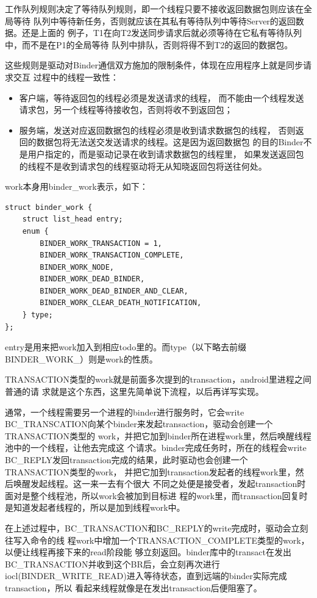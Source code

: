 \documentclass[a4paper,11pt]{article}
\begin{document}
工作队列规则决定了等待队列规则，即一个线程只要不接收返回数据包则应该在全局等待
队列中等待新任务，否则就应该在其私有等待队列中等待Server的返回数据。还是上面的
例子，T1在向T2发送同步请求后就必须等待在它私有等待队列中，而不是在P1的全局等待
队列中排队，否则将得不到T2的返回的数据包。

这些规则是驱动对Binder通信双方施加的限制条件，体现在应用程序上就是同步请求交互
过程中的线程一致性：
\begin{itemize}
    \item 客户端，等待返回包的线程必须是发送请求的线程，
        而不能由一个线程发送请求包，另一个线程等待接收包，否则将收不到返回包；
    \item 服务端，发送对应返回数据包的线程必须是收到请求数据包的线程，
        否则返回的数据包将无法送交发送请求的线程。这是因为返回数据包
        的目的Binder不是用户指定的，而是驱动记录在收到请求数据包的线程里，
        如果发送返回包的线程不是收到请求包的线程驱动将无从知晓返回包将送往何处。
\end{itemize}

work本身用binder_work表示，如下：
\begin{lstlisting}
struct binder_work {
    struct list_head entry;
    enum {
        BINDER_WORK_TRANSACTION = 1,
        BINDER_WORK_TRANSACTION_COMPLETE,
        BINDER_WORK_NODE,
        BINDER_WORK_DEAD_BINDER,
        BINDER_WORK_DEAD_BINDER_AND_CLEAR,
        BINDER_WORK_CLEAR_DEATH_NOTIFICATION,
    } type;
};
\end{lstlisting}
entry是用来把work加入到相应todo里的。而type（以下略去前缀BINDER_WORK_）则是work的性质。

TRANSACTION类型的work就是前面多次提到的transaction，android里进程之间普通的请
求就是这个东西，这里先简单说下流程，以后再详写实现。

通常，一个线程需要另一个进程的binder进行服务时，它会write
BC_TRANSCATION向某个binder来发起transaction，驱动会创建一个TRANSACTION类型的
work，并把它加到binder所在进程work里，然后唤醒线程池中的一个线程，让他去完成这
个请求。binder完成任务时，所在的线程会write
BC_REPLY发回transaction完成的结果，此时驱动也会创建一个TRANSACTION类型的work，
并把它加到transaction发起者的线程work里，然后唤醒发起线程。这一来一去有个很大
不同之处便是接受者，发起transaction时面对是整个线程池，所以work会被加到目标进
程的work里，而transaction回复时是知道发起者线程的，所以是加到线程work中。

在上述过程中，BC_TRANSACTION和BC_REPLY的write完成时，驱动会立刻往写入命令的线
程work中增加一个TRANSACTION_COMPLETE类型的work，以便让线程再接下来的read阶段能
够立刻返回。binder库中的transact在发出BC_TRANSACTION并收到这个BR后，会立刻再次进行
iocl(BINDER_WRITE_READ)进入等待状态，直到远端的binder实际完成transaction，所以
看起来线程就像是在发出transaction后便阻塞了。
\end{document}
